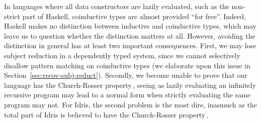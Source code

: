 
In languages where all data constructors are lazily evaluated, such as the
non-strict part of Haskell, coinductive types are almost provided ``for
free''. Indeed, Haskell makes no distinction between inductive and coinductive
types, which may leave us to question whether the distinction matters at
all. However, avoiding the distinction in general has at least two important
consequences. First, we may lose subject reduction in a dependently typed
system, since we cannot selectively disallow pattern matching on coinductive
types (we elaborate upon this issue in
Section~\ref{sec:recov-subj-reduct}). Secondly, we become unable to prove that
our language has the Church-Rosser property\,\citep{CR:36}, seeing as lazily
evaluating an infinitely recursive program may lead to a normal form when
strictly evaluating the same program may not. For Idris, the second problem is
the most dire, inasmuch as the total part of Idris is believed to have the
Church-Rosser property\,\citep{BradyIdrisImpl13}.






